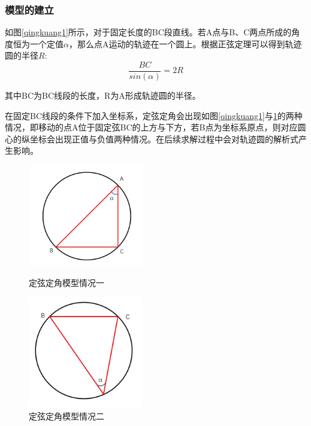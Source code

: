 \documentclass{my_paper}
\begin{document}
\subsubsection{模型的建立}

如图\ref{qingkuang1}所示，对于固定长度的BC段直线。若A点与B、C两点所成的角度恒为一个定值$\alpha$，那么点A运动的轨迹在一个圆上。根据正弦定理可以得到轨迹圆的半径$R$:
\begin{equation}
    \frac{BC}{sin(\alpha)} = 2R
\end{equation}

其中BC为BC线段的长度，R为A形成轨迹圆的半径。

在固定BC线段的条件下加入坐标系，定弦定角会出现如图\ref{qingkuang1}与\ref{qingkuang2}的两种情况，即移动的点A位于固定弦BC的上方与下方，若B点为坐标系原点，则对应圆心的纵坐标会出现正值与负值两种情况。在后续求解过程中会对轨迹圆的解析式产生影响。



\begin{figure}[htbp]
    \centering
    \begin{minipage}[t]{0.48\textwidth}
        \centering
        \includegraphics[width=5cm]{images/dingxiandingjiao.jpg}
        \caption{定弦定角模型情况一}
        \label{qingkuang1}
    \end{minipage}
    \begin{minipage}[t]{0.48\textwidth}
        \centering
        \includegraphics[width=5cm]{images/dingxiandingjiao2.jpg}
        \caption{定弦定角模型情况二}
        \label{qingkuang2}
    \end{minipage}
\end{figure}
\end{document}
